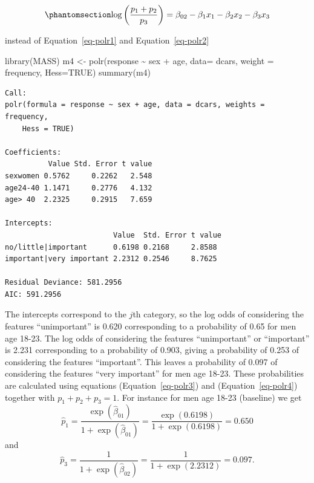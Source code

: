 \documentclass[
  letterpaper,
  DIV=11,
  numbers=noendperiod]{scrartcl}
\newenvironment{Shaded}{\begin{snugshade}}{\end{snugshade}}
\newcommand{\AttributeTok}[1]{\textcolor[rgb]{0.40,0.45,0.13}{#1}}
\newcommand{\ConstantTok}[1]{\textcolor[rgb]{0.56,0.35,0.01}{#1}}
\newcommand{\FunctionTok}[1]{\textcolor[rgb]{0.28,0.35,0.67}{#1}}
\newcommand{\NormalTok}[1]{\textcolor[rgb]{0.00,0.23,0.31}{#1}}
\newcommand{\OtherTok}[1]{\textcolor[rgb]{0.00,0.23,0.31}{#1}}
\newcommand{\SpecialCharTok}[1]{\textcolor[rgb]{0.37,0.37,0.37}{#1}}
\begin{document}
\begin{equation}\phantomsection\label{eq-polr4}{
\log \left(\frac {p_1+p_2} {p_3}\right) = \beta_{02} - \beta_{1}x_1 - \beta_{2}x_2 -\beta_{3}x_3 
}\end{equation}

instead of Equation~\ref{eq-polr1} and Equation~\ref{eq-polr2}

\begin{Shaded}
\begin{Highlighting}[]
\FunctionTok{library}\NormalTok{(MASS)}
\NormalTok{m4 }\OtherTok{\textless{}{-}} \FunctionTok{polr}\NormalTok{(response }\SpecialCharTok{\textasciitilde{}}\NormalTok{ sex }\SpecialCharTok{+}\NormalTok{ age, }\AttributeTok{data=}\NormalTok{ dcars, }\AttributeTok{weight =}\NormalTok{ frequency, }\AttributeTok{Hess=}\ConstantTok{TRUE}\NormalTok{)}
\FunctionTok{summary}\NormalTok{(m4)}
\end{Highlighting}
\end{Shaded}

\begin{verbatim}
Call:
polr(formula = response ~ sex + age, data = dcars, weights = frequency, 
    Hess = TRUE)

Coefficients:
          Value Std. Error t value
sexwomen 0.5762     0.2262   2.548
age24-40 1.1471     0.2776   4.132
age> 40  2.2325     0.2915   7.659

Intercepts:
                         Value  Std. Error t value
no/little|important      0.6198 0.2168     2.8588 
important|very important 2.2312 0.2546     8.7625 

Residual Deviance: 581.2956 
AIC: 591.2956 
\end{verbatim}

The intercepts correspond to the \(j\)th category, so the log odds of
considering the features ``unimportant'' is 0.620 corresponding to a
probability of 0.65 for men age 18-23. The log odds of considering the
features ``unimportant'' or ``important'' is 2.231 corresponding to a
probability of 0.903, giving a probability of 0.253 of considering the
features ``important''. This leaves a probability of 0.097 of
considering the features ``very important'' for men age 18-23. These
probabilities are calculated using equations (Equation~\ref{eq-polr3})
and (Equation~\ref{eq-polr4}) together with \(p_1+p_2+p_3=1\). For
instance for men age 18-23 (baseline) we get
\[\hat{p}_1=\frac{\exp(\hat{\beta}_{01})}{1+\exp(\hat{\beta}_{01})}=\frac{\exp(0.6198)}{1+\exp(0.6198)}=0.650\]
and
\[\hat{p}_3=\frac{1}{1+\exp(\hat{\beta}_{02})}=\frac{1}{1+\exp(2.2312)}=0.097.\]
\end{document}
